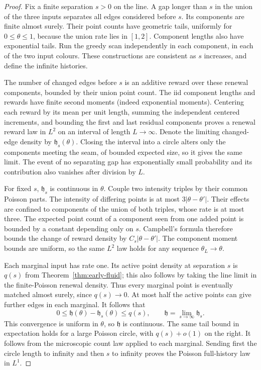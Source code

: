 \documentclass[11pt,letterpaper]{article}
\begin{document}
\begin{proof}
Fix a finite separation $s>0$ on the line. A gap longer than $s$
in the union of the three inputs separates all edges considered
before $s$. Its components are finite almost surely. Their point
counts have geometric tails, uniformly for $0\le\theta\le1$,
because the union rate lies in $[1,2]$. Component lengths also have
exponential tails. Run the greedy scan independently in each
component, in each of the two input colours. These constructions
are consistent as $s$ increases, and define the infinite histories.

The number of changed edges before $s$ is an additive reward over
these renewal components, bounded by their union point count.
The iid component lengths and rewards have finite second moments
(indeed exponential moments). Centering each reward by its mean
per unit length, summing the independent centered increments, and
bounding the first and last residual components proves a renewal
reward law in $L^2$ on an interval of length $L\to\infty$.
Denote the limiting changed-edge density by $\mathfrak h_s(\theta)$.
Closing the interval into a circle alters only the components meeting
the seam, of bounded expected size, so it gives the same limit.
The event of no separating gap has exponentially small probability
and its contribution also vanishes after division by $L$.

For fixed $s$, $\mathfrak h_s$ is continuous in $\theta$.
Couple two intensity triples by their common Poisson parts. The
intensity of differing points is at most $3|\theta-\theta'|$.
Their effects are confined to components of the union of both
triples, whose rate is at most three. The expected point count
of a component seen from one added point is bounded by a constant
depending only on $s$. Campbell's formula therefore bounds the
change of reward density by $C_s|\theta-\theta'|$.
The component moment bounds are uniform, so the same $L^2$ law
holds for any sequence $\theta_L\to\theta$.

Each marginal input has rate one. Its active point density at
separation $s$ is $q(s)$ from Theorem~\ref{thm:early-fluid}; this
also follows by taking the line limit in the finite-Poisson renewal
density. Thus every marginal point is eventually matched almost
surely, since $q(s)\to0$. At most half the active points can give
further edges in each marginal. It follows that
\[
 0\le\mathfrak h(\theta)-\mathfrak h_s(\theta)\le q(s),
 \qquad \mathfrak h=\lim_{s\to\infty}\mathfrak h_s.
\]
This convergence is uniform in $\theta$, so $\mathfrak h$ is
continuous. The same tail bound in expectation holds for a large
Poisson circle, with $q(s)+o(1)$ on the right. It follows from
the microscopic count law applied to each marginal. Sending first
the circle length to infinity and then $s$ to infinity proves the
Poisson full-history law in $L^1$.


\end{proof}
\end{document}

